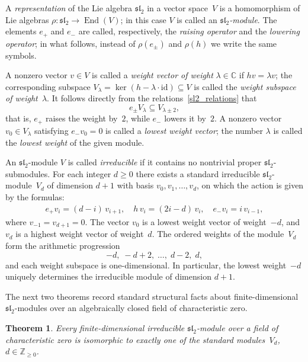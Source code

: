 \documentclass[12pt,reqno]{amsart}
\newtheorem{theorem}{Theorem}[section]
\begin{document}
\medskip

A \emph{representation} of the Lie algebra $\mathfrak{sl}_2$ in a vector
space~$V$ is a homomorphism of Lie algebras
$\rho : \mathfrak{sl}_2 \to \operatorname{End}(V)$;
in this case $V$ is called an \emph{$\mathfrak{sl}_2$-module}.
The elements $e_+$ and $e_-$ are called, respectively, the \emph{raising
operator} and the \emph{lowering operator}; in what follows, instead of
$\rho(e_\pm)$ and $\rho(h)$ we write the same symbols.

A nonzero vector $v \in V$ is called a \emph{weight vector of weight}
$\lambda \in \mathbb{C}$ if $hv = \lambda v$; the corresponding subspace
$V_\lambda = \ker(h - \lambda \cdot \mathrm{id}) \subseteq V$
is called the \emph{weight subspace of weight~$\lambda$}.
It follows directly from the relations~\eqref{sl2_relations} that
$$
  e_\pm V_\lambda \subseteq V_{\lambda \pm 2},
$$
that is, $e_+$ raises the weight by~$2$, while $e_-$ lowers it by~$2$.
A nonzero vector $v_0 \in V_\lambda$ satisfying $e_- v_0 = 0$ is called a
\emph{lowest weight vector}; the number $\lambda$ is called the
\emph{lowest weight} of the given module.

\medskip

An $\mathfrak{sl}_2$-module $V$ is called \emph{irreducible} if it contains
no nontrivial proper $\mathfrak{sl}_2$-submodules.
For each integer $d \ge 0$ there exists a standard irreducible
$\mathfrak{sl}_2$-module~$V_d$ of dimension $d+1$ with basis
$v_0, v_1, \dots, v_d$, on which the action is given by the formulas:
\begin{gather*}
  e_+ v_i = (d-i)\, v_{i+1}, \quad
  h\, v_i = (2i-d)\, v_i, \quad 
  e_- v_i = i\, v_{i-1},
\end{gather*}
where $v_{-1} = v_{d+1} = 0$.
The vector $v_0$ is a lowest weight vector of weight~$-d$, and $v_d$ is a
highest weight vector of weight~$d$.
The ordered weights of the module~$V_d$ form the arithmetic progression
$$
  -d,\; -d+2,\; \ldots,\; d-2,\; d,
$$
and each weight subspace is one-dimensional.
In particular, the lowest weight~$-d$ uniquely determines the irreducible
module of dimension $d+1$.

The next two theorems record standard structural facts about
finite-dimensional $\mathfrak{sl}_2$-modules over an algebraically closed
field of characteristic zero.

\begin{theorem}
  Every finite-dimensional irreducible $\mathfrak{sl}_2$-module over a field
  of characteristic zero is isomorphic to exactly one of the standard
  modules~$V_d$, $d \in \mathbb{Z}_{\ge 0}$.
\end{theorem}
\end{document}
